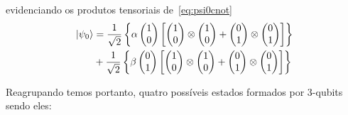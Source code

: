 evidenciando os produtos tensoriais de~\eqref{eq:psi0cnot}
\begin{equation}
	\begin{split}
\ket{\psi_0} &= \frac{1}{\sqrt{2}}\left\{\alpha \begin{pmatrix}
1 \\
0 
\end{pmatrix} \left[ \begin{pmatrix}
1 \\
0 
\end{pmatrix} \otimes \begin{pmatrix}
1 \\
0
\end{pmatrix} + \begin{pmatrix}
0 \\
1
\end{pmatrix} \otimes \begin{pmatrix}
0 \\
1
\end{pmatrix}\right]\right\} \\
&+ \frac{1}{\sqrt{2}}\left\{\beta \begin{pmatrix}
0 \\
1
\end{pmatrix} \left[ \begin{pmatrix}
1 \\
0 
\end{pmatrix} \otimes \begin{pmatrix}
1 \\
0
\end{pmatrix} + \begin{pmatrix}
0 \\
1
\end{pmatrix} \otimes \begin{pmatrix}
0 \\
1
\end{pmatrix}\right]\right\}
	\end{split}
\end{equation}

Reagrupando temos portanto, quatro possíveis estados formados por 3-qubits sendo eles:

